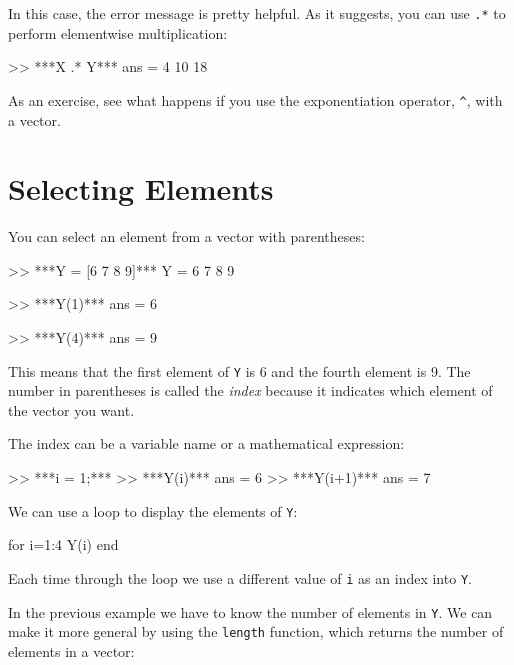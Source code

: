 In this case, the error message is pretty helpful.  As it suggests, you can use {\tt .*} to perform elementwise multiplication:


\begin{code}
>> ***X .* Y***
ans = 4    10    18
\end{code}

As an exercise, see what happens if you use the exponentiation operator,
\verb"^", with a vector.

\section{Selecting Elements}


You can select an element from a vector with parentheses:

\begin{code}
>> ***Y = [6 7 8 9]***
Y = 6    7     8     9

>> ***Y(1)***
ans = 6

>> ***Y(4)***
ans = 9
\end{code}

This means that the first element of {\tt Y} is 6 and the
fourth element is 9.
The number in parentheses is called the \emph{index} because it indicates which element of the vector you want.


The index can be a variable name or a mathematical expression:

\begin{code}
>> ***i = 1;***
>> ***Y(i)***
ans = 6
>> ***Y(i+1)***
ans = 7
\end{code}

We can use a loop to display the elements of {\tt Y}:


\begin{code}
for i=1:4
     Y(i)
end
\end{code}

Each time through the loop we use a different value of {\tt i}
as an index into {\tt Y}.


In the previous example we have to know the number
of elements in {\tt Y}.  We can make it more general by using
the {\tt length} function, which returns the number of elements
in a vector:

